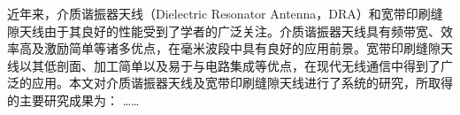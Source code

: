 	
\begin{chineseabstract}

近年来，介质谐振器天线（Dielectric Resonator Antenna，DRA）和宽带印刷缝隙天线由于其良好的性能受到了学者的广泛关注。介质谐振器天线具有频带宽、效率高及激励简单等诸多优点，在毫米波段中具有良好的应用前景。宽带印刷缝隙天线以其低剖面、加工简单以及易于与电路集成等优点，在现代无线通信中得到了广泛的应用。本文对介质谐振器天线及宽带印刷缝隙天线进行了系统的研究，所取得的主要研究成果为：
……

\end{chineseabstract}

